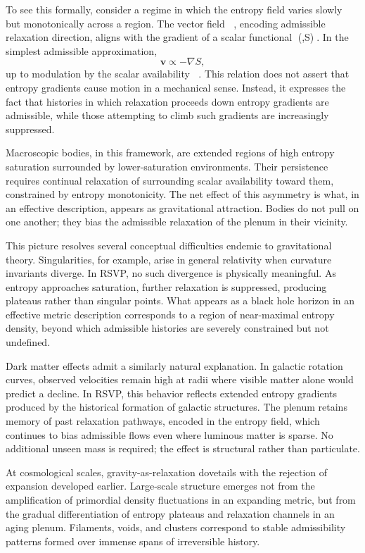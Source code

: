 \documentclass[11pt,oneside]{book}
\begin{document}
To see this formally, consider a regime in which the entropy field varies slowly but monotonically across a region. The vector field , encoding admissible relaxation direction, aligns with the gradient of a scalar functional \Psi(\Phi,S). In the simplest admissible approximation,
\[
\mathbf{v} \propto -\nabla S,
\]
up to modulation by the scalar availability \Phi. This relation does not assert that entropy gradients cause motion in a mechanical sense. Instead, it expresses the fact that histories in which relaxation proceeds down entropy gradients are admissible, while those attempting to climb such gradients are increasingly suppressed.

Macroscopic bodies, in this framework, are extended regions of high entropy saturation surrounded by lower-saturation environments. Their persistence requires continual relaxation of surrounding scalar availability toward them, constrained by entropy monotonicity. The net effect of this asymmetry is what, in an effective description, appears as gravitational attraction. Bodies do not pull on one another; they bias the admissible relaxation of the plenum in their vicinity.

This picture resolves several conceptual difficulties endemic to gravitational theory. Singularities, for example, arise in general relativity when curvature invariants diverge. In RSVP, no such divergence is physically meaningful. As entropy approaches saturation, further relaxation is suppressed, producing plateaus rather than singular points. What appears as a black hole horizon in an effective metric description corresponds to a region of near-maximal entropy density, beyond which admissible histories are severely constrained but not undefined.

Dark matter effects admit a similarly natural explanation. In galactic rotation curves, observed velocities remain high at radii where visible matter alone would predict a decline. In RSVP, this behavior reflects extended entropy gradients produced by the historical formation of galactic structures. The plenum retains memory of past relaxation pathways, encoded in the entropy field, which continues to bias admissible flows even where luminous matter is sparse. No additional unseen mass is required; the effect is structural rather than particulate.

At cosmological scales, gravity-as-relaxation dovetails with the rejection of expansion developed earlier. Large-scale structure emerges not from the amplification of primordial density fluctuations in an expanding metric, but from the gradual differentiation of entropy plateaus and relaxation channels in an aging plenum. Filaments, voids, and clusters correspond to stable admissibility patterns formed over immense spans of irreversible history.
\end{document}
